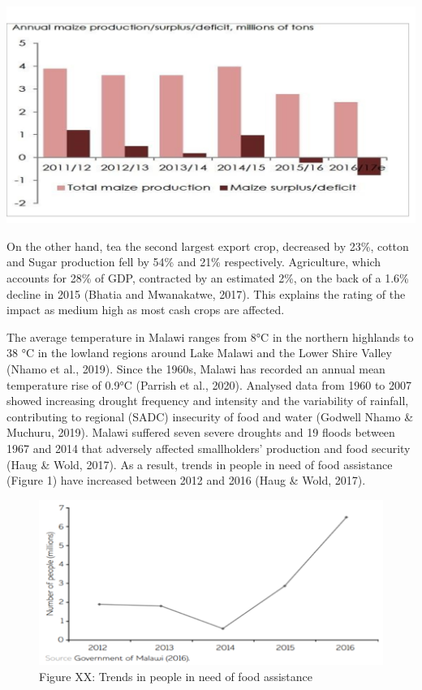 \documentclass[
]{book}
\begin{document}
\includegraphics{images/maize_prodn.png}

On the other hand, tea the second largest export crop, decreased by 23\%, cotton and Sugar production fell by 54\% and 21\% respectively. Agriculture, which accounts for 28\% of GDP, contracted by an estimated 2\%, on the back of a 1.6\% decline in 2015 (Bhatia and Mwanakatwe, 2017). This explains the rating of the impact as medium high as most cash crops are affected.

The average temperature in Malawi ranges from 8°C in the northern highlands to 38 °C in the lowland regions around Lake Malawi and the Lower Shire Valley (Nhamo et al., 2019). Since the 1960s, Malawi has recorded an annual mean temperature rise of 0.9°C (Parrish et al., 2020). Analysed data from 1960 to 2007 showed increasing drought frequency and intensity and the variability of rainfall, contributing to regional (SADC) insecurity of food and water (Godwell Nhamo \& Muchuru, 2019). Malawi suffered seven severe droughts and 19 floods between 1967 and 2014 that adversely affected smallholders' production and food security (Haug \& Wold, 2017). As a result, trends in people in need of food assistance (Figure 1) have increased between 2012 and 2016 (Haug \& Wold, 2017).

\begin{figure}
\centering
\includegraphics{images/food_assistance.png}
\caption{Figure XX: Trends in people in need of food assistance}
\end{figure}
\end{document}
